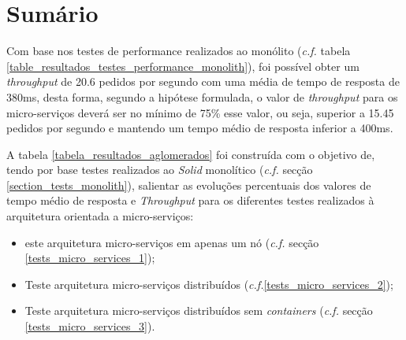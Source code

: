 \section{Sumário}
Com base nos testes de performance realizados ao monólito (\emph{c.f.} tabela \ref{table_resultados_testes_performance_monolith}), foi possível obter um \emph{throughput} de 20.6 pedidos por segundo com uma média de tempo de resposta de 380ms, desta forma, segundo a hipótese formulada, o valor de \emph{throughput} para os micro-serviços deverá ser no mínimo de 75\% esse valor, ou seja, superior a 15.45 pedidos por segundo e mantendo um tempo médio de resposta inferior a 400ms.

A tabela \ref{tabela_resultados_aglomerados} foi construída com o objetivo de, tendo por base testes realizados ao \emph{Solid} monolítico (\emph{c.f.} secção \ref{section_tests_monolith}), salientar as evoluções percentuais dos valores de tempo médio de resposta e \emph{Throughput} para os diferentes testes realizados à arquitetura orientada a micro-serviços:
\begin{itemize}
    \item este arquitetura micro-serviços em apenas um nó (\emph{c.f.} secção \ref{tests_micro_services_1});
    \item Teste arquitetura micro-serviços distribuídos (\emph{c.f.}\ref{tests_micro_services_2});
    \item Teste arquitetura micro-serviços distribuídos sem \emph{containers} (\emph{c.f.} secção \ref{tests_micro_services_3}).
\end{itemize}

